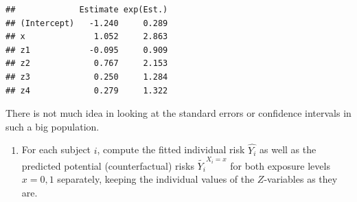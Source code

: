 \documentclass[
]{book}
\newenvironment{Shaded}{\begin{snugshade}}{\end{snugshade}}
\newcommand{\AttributeTok}[1]{\textcolor[rgb]{0.13,0.29,0.53}{#1}}
\newcommand{\CommentTok}[1]{\textcolor[rgb]{0.56,0.35,0.01}{\textit{#1}}}
\newcommand{\DecValTok}[1]{\textcolor[rgb]{0.00,0.00,0.81}{#1}}
\newcommand{\FunctionTok}[1]{\textcolor[rgb]{0.13,0.29,0.53}{\textbf{#1}}}
\newcommand{\NormalTok}[1]{#1}
\newcommand{\OtherTok}[1]{\textcolor[rgb]{0.56,0.35,0.01}{#1}}
\newcommand{\SpecialCharTok}[1]{\textcolor[rgb]{0.81,0.36,0.00}{\textbf{#1}}}
\newcommand{\StringTok}[1]{\textcolor[rgb]{0.31,0.60,0.02}{#1}}
\providecommand{\tightlist}{%
  \setlength{\itemsep}{0pt}\setlength{\parskip}{0pt}}
\begin{document}
\begin{verbatim}
##             Estimate exp(Est.)
## (Intercept)   -1.240     0.289
## x              1.052     2.863
## z1            -0.095     0.909
## z2             0.767     2.153
## z3             0.250     1.284
## z4             0.279     1.322
\end{verbatim}

There is not much idea in looking at the standard errors or
confidence intervals in such a big population.

\begin{enumerate}
\def\labelenumi{\arabic{enumi}.}
\setcounter{enumi}{1}
\tightlist
\item
  For each subject \(i\), compute the fitted individual risk
  \(\widehat{Y_i}\) as well as the predicted potential
  (counterfactual) risks
  \(\widetilde{Y_i}^{X_i=x}\) for both exposure levels \(x=0,1\)
  separately, keeping the individual values of the
  \(Z\)-variables as they are.
\end{enumerate}

\begin{Shaded}
\end{Shaded}
\end{document}
